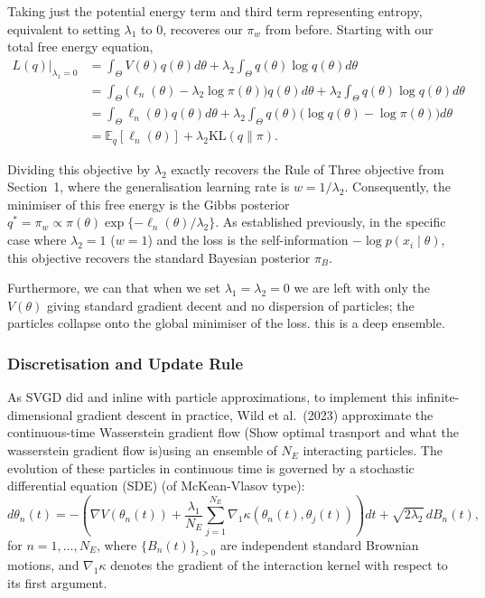 \documentclass[mstat,12pt]{unswthesis}
\newcommand{\add}[1]{{\color{red}#1}}
\begin{document}
Taking just the potential energy term and third term representing entropy, equivalent to setting $\lambda_1$ to 0, recoveres our $\pi_w$ from before. Starting with our total free energy equation,
\begin{align*}
    L(q)\big|_{\lambda_1=0} & = \int_\Theta V(\theta)q(\theta)d\theta + \lambda_2\int_\Theta q(\theta)\log q(\theta)d\theta                                              \\
                            & = \int_\Theta \big( \ell_n(\theta) - \lambda_2\log\pi(\theta) \big) q(\theta)d\theta + \lambda_2\int_\Theta q(\theta)\log q(\theta)d\theta \\
                            & = \int_\Theta \ell_n(\theta)q(\theta)d\theta + \lambda_2\int_\Theta q(\theta) \big( \log q(\theta) - \log\pi(\theta) \big)d\theta          \\
                            & = \mathbb{E}_q[\ell_n(\theta)] + \lambda_2\mathrm{KL}(q\|\pi).
\end{align*}

Dividing this objective by $\lambda_2$ exactly recovers the Rule of Three objective from Section~1, where the generalisation learning rate is $w = 1/\lambda_2$. Consequently, the minimiser of this free energy is the Gibbs posterior $q^{*} = \pi_w \propto \pi(\theta)\exp\{-\ell_n(\theta)/\lambda_2\}$. As established previously, in the specific case where $\lambda_2=1$ ($w=1$) and the loss is the self-information $-\log p(x_i \mid \theta)$, this objective recovers the standard Bayesian posterior $\pi_B$.

Furthermore, we can that when we set $\lambda_1 = \lambda_2 = 0$ we are left with only the $V(\theta)$ giving standard gradient decent and no dispersion of particles; the particles collapse onto the global minimiser of the loss. \add{this is a deep ensemble.}



\subsubsection*{Discretisation and Update Rule}

As SVGD did and inline with particle approximations, to implement this infinite-dimensional gradient descent in practice, Wild et al.~(2023) approximate the continuous-time Wasserstein gradient flow (\add{Show optimal trasnport and what the wasserstein gradient flow is})using an ensemble of $N_E$ interacting particles. The evolution of these particles in continuous time is governed by a stochastic differential equation (SDE) (\add{of McKean-Vlasov type}):
\begin{equation}
    d\theta_n(t) = -\left( \nabla V(\theta_n(t)) + \frac{\lambda_1}{N_E} \sum_{j=1}^{N_E} \nabla_1 \kappa(\theta_n(t), \theta_j(t)) \right) dt + \sqrt{2\lambda_2} \, dB_n(t),
\end{equation}
for $n = 1, \dots, N_E$, where $\{B_n(t)\}_{t>0}$ are independent standard Brownian motions, and $\nabla_1 \kappa$ denotes the gradient of the interaction kernel with respect to its first argument.
\end{document}
